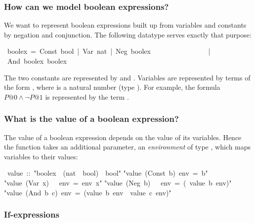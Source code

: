 \begin{isabelle}%
%
\begin{isamarkuptext}%
\subsubsection{How can we model boolean expressions?}

We want to represent boolean expressions built up from variables and
constants by negation and conjunction. The following datatype serves exactly
that purpose:%
\end{isamarkuptext}%
\ boolex\ =\ Const\ bool\ |\ Var\ nat\ |\ Neg\ boolex\isanewline
\ \ \ \ \ \ \ \ \ \ \ \ \ \ \ \ |\ And\ boolex\ boolex%
\begin{isamarkuptext}%
\noindent
The two constants are represented by  and
. Variables are represented by terms of the form
, where  is a natural number (type ).
For example, the formula $P@0 \land \neg P@1$ is represented by the term
.

\subsubsection{What is the value of a boolean expression?}

The value of a boolean expression depends on the value of its variables.
Hence the function  takes an additional parameter, an {\em
  environment} of type , which maps variables to
their values:%
\end{isamarkuptext}%
\ value\ ::\ {"}boolex\ {\isasymRightarrow}\ (nat\ {\isasymRightarrow}\ bool)\ {\isasymRightarrow}\ bool{"}\isanewline
{}\isanewline
{"}value\ (Const\ b)\ env\ =\ b{"}\isanewline
{"}value\ (Var\ x)\ \ \ env\ =\ env\ x{"}\isanewline
{"}value\ (Neg\ b)\ \ \ env\ =\ ({\isasymnot}\ value\ b\ env){"}\isanewline
{"}value\ (And\ b\ c)\ env\ =\ (value\ b\ env\ {\isasymand}\ value\ c\ env){"}%
\begin{isamarkuptext}%
\noindent
\subsubsection{If-expressions}


\end{isamarkuptext}
\end{isabelle}
